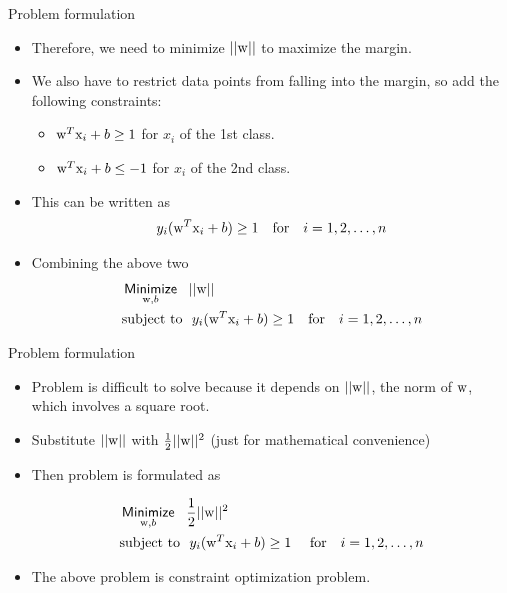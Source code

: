 \begin{frame}{Problem formulation}
\begin{itemize}
\item Therefore, we need to minimize $||{\rm w}||$ to maximize the margin.
\item We also have to restrict data points from falling into the margin, so add the following constraints:
\begin{itemize}
\item ${\rm w}^T{\rm x}_i+b\geq 1$ for ${x}_i$ of the 1st class.
\item ${\rm w}^T{\rm x}_i+b\leq -1$ for ${x}_i$ of the 2nd class.
\end{itemize}
\item This can be written as
\[y_i({\rm w}^T{\rm x}_i+b)\geq 1~~~\text{for}~~~i=1,2,\ldots,n\]
\item Combining the above two
\begin{align*}
&\mathop{\sf Minimize}\limits_{{\rm w},b}~~||{\rm w}||\\
&\text{subject to}~~y_i( {{{\rm w}^T}{{\rm x}_i} + b} ) \geq 1~~~\text{for}~~~i=1,2,\ldots,n
\end{align*}
\end{itemize}
\end{frame}

\begin{frame}{Problem formulation}
\begin{itemize}

\item Problem is difficult to solve because it depends on $||{\rm w}||$, the norm of ${\rm w}$, which involves a square root.
\item Substitute $||{\rm w}||$ with $\frac{1}{2}||{\rm w}||^2$ (just for mathematical convenience)
\item Then problem is formulated as

\begin{align*}
&\mathop{\sf Minimize}\limits_{{\rm w},b}~~\frac{1}{2}||{\rm w}||^2\\
&\text{subject to}~~y_i( {{{\rm w}^T}{{\rm x}_i} + b} ) \geq 1~~~~\text{for}~~~i=1,2,\ldots,n
\end{align*}
\item The above problem is {\color{mycolor1}constraint optimization problem}.
\end{itemize}
\end{frame}


